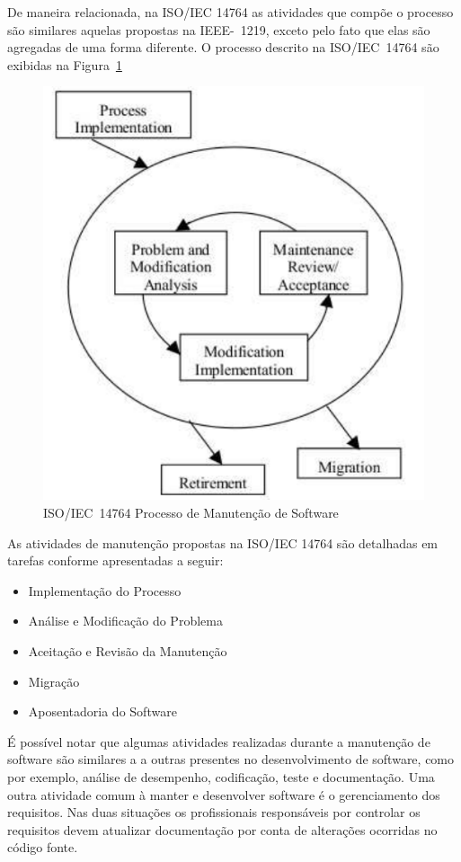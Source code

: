 De maneira relacionada, na ISO/IEC 14764 as atividades que compõe o processo são similares aquelas
propostas na IEEE-~1219, exceto pelo fato que elas são agregadas de uma forma diferente. O processo
descrito na ISO/IEC~14764 são exibidas na Figura~\ref{fig:ieee-14764-processo-manutencao}

\begin{figure}[htpb]
	\centering
	\includegraphics[width=0.8\linewidth]{chapter-manutencao-software-visao-geral/img/ieee-14764-processo-manutencao.pdf}
	\caption{ISO/IEC~14764 Processo de Manutenção de Software}
	\label{fig:ieee-14764-processo-manutencao}
\end{figure}

As atividades de manutenção propostas na ISO/IEC 14764 são detalhadas em tarefas conforme apresentadas
a seguir:

\begin{itemize}
	\item Implementação do Processo
	\item Análise e Modificação do Problema
	\item Aceitação e Revisão da Manutenção
	\item Migração
	\item Aposentadoria do Software	
\end{itemize}

É possível notar que algumas atividades realizadas durante a manutenção de software são similares a
a outras presentes no desenvolvimento de software, como por exemplo, análise de desempenho,
codificação, teste e documentação. Uma outra atividade comum à manter e desenvolver software é o
gerenciamento dos requisitos. Nas duas situações os profissionais responsáveis por controlar os
requisitos devem atualizar documentação  por conta de alterações ocorridas no código fonte. 

